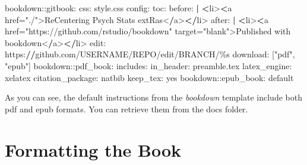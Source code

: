 \documentclass[
]{book}
\newenvironment{Shaded}{\begin{snugshade}}{\end{snugshade}}
\newcommand{\ErrorTok}[1]{\textcolor[rgb]{0.64,0.00,0.00}{\textbf{#1}}}
\newcommand{\NormalTok}[1]{#1}
\newcommand{\OtherTok}[1]{\textcolor[rgb]{0.56,0.35,0.01}{#1}}
\newcommand{\SpecialCharTok}[1]{\textcolor[rgb]{0.00,0.00,0.00}{#1}}
\newcommand{\StringTok}[1]{\textcolor[rgb]{0.31,0.60,0.02}{#1}}
\begin{document}
\begin{Shaded}
\begin{Highlighting}[]
\NormalTok{bookdown}\SpecialCharTok{::}\NormalTok{gitbook}\SpecialCharTok{:}
\NormalTok{  css}\SpecialCharTok{:}\NormalTok{ style.css}
\NormalTok{  config}\SpecialCharTok{:}
\NormalTok{    toc}\SpecialCharTok{:}
\NormalTok{      before}\SpecialCharTok{:} \ErrorTok{|}
        \ErrorTok{\textless{}}\NormalTok{li}\SpecialCharTok{\textgreater{}}\ErrorTok{\textless{}}\NormalTok{a href}\OtherTok{=}\StringTok{"./"}\SpecialCharTok{\textgreater{}}\NormalTok{ReCentering Psych Stats extRas}\SpecialCharTok{\textless{}}\ErrorTok{/}\NormalTok{a}\SpecialCharTok{\textgreater{}}\ErrorTok{\textless{}/}\NormalTok{li}\SpecialCharTok{\textgreater{}}
\NormalTok{      after}\SpecialCharTok{:} \ErrorTok{|}
        \ErrorTok{\textless{}}\NormalTok{li}\SpecialCharTok{\textgreater{}}\ErrorTok{\textless{}}\NormalTok{a href}\OtherTok{=}\StringTok{"https://github.com/rstudio/bookdown"}\NormalTok{ target}\OtherTok{=}\StringTok{"blank"}\SpecialCharTok{\textgreater{}}\NormalTok{Published with bookdown}\SpecialCharTok{\textless{}}\ErrorTok{/}\NormalTok{a}\SpecialCharTok{\textgreater{}}\ErrorTok{\textless{}/}\NormalTok{li}\SpecialCharTok{\textgreater{}}
\NormalTok{    edit}\SpecialCharTok{:}\NormalTok{ https}\SpecialCharTok{:}\ErrorTok{//}\NormalTok{github.com}\SpecialCharTok{/}\NormalTok{USERNAME}\SpecialCharTok{/}\NormalTok{REPO}\SpecialCharTok{/}\NormalTok{edit}\SpecialCharTok{/}\NormalTok{BRANCH}\SpecialCharTok{/}\NormalTok{\%s}
\NormalTok{    download}\SpecialCharTok{:}\NormalTok{ [}\StringTok{"pdf"}\NormalTok{, }\StringTok{"epub"}\NormalTok{]}
\NormalTok{bookdown}\SpecialCharTok{::}\NormalTok{pdf\_book}\SpecialCharTok{:}
\NormalTok{  includes}\SpecialCharTok{:}
\NormalTok{    in\_header}\SpecialCharTok{:}\NormalTok{ preamble.tex}
\NormalTok{  latex\_engine}\SpecialCharTok{:}\NormalTok{ xelatex}
\NormalTok{  citation\_package}\SpecialCharTok{:}\NormalTok{ natbib}
\NormalTok{  keep\_tex}\SpecialCharTok{:}\NormalTok{ yes}
\NormalTok{bookdown}\SpecialCharTok{::}\NormalTok{epub\_book}\SpecialCharTok{:}\NormalTok{ default}
\end{Highlighting}
\end{Shaded}

As you can see, the default instructions from the \emph{bookdown} template include both pdf and epub formats. You can retrieve them from the docs folder.

\hypertarget{formatting-the-book}{%
\chapter{Formatting the Book}\label{formatting-the-book}}
\end{document}
